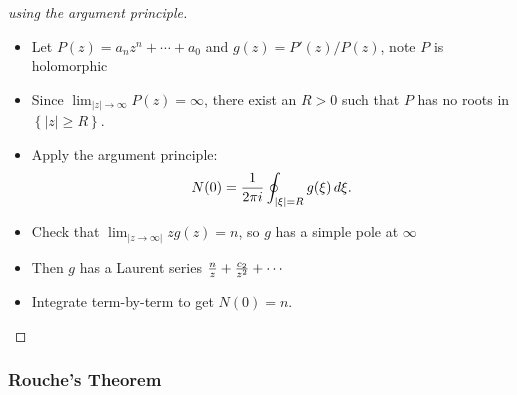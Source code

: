 \begin{proof}[using the argument principle]

\envlist

\begin{itemize}
\tightlist
\item
  Let \(P(z) = a_nz^n + \cdots + a_0\) and \(g(z) = P'(z)/P(z)\), note
  \(P\) is holomorphic
\item
  Since
  \(\lim_{{\left\lvert {z} \right\rvert} \to \infty} P(z) = \infty\),
  there exist an \(R>0\) such that \(P\) has no roots in
  \(\left\{{{\left\lvert {z} \right\rvert} \geq R}\right\}\).
\item
  Apply the argument principle:
  \begin{align*}     N(0) = {1\over 2\pi i} \oint_{{\left\lvert {\xi} \right\rvert} = R} g(\xi) \,d\xi     .\end{align*}
\item
  Check that
  \(\lim_{{\left\lvert {z\to \infty} \right\rvert}}zg(z) = n\), so \(g\)
  has a simple pole at \(\infty\)
\item
  Then \(g\) has a Laurent series
  \({n\over z} + {c_2 \over z^2} + \cdots\)
\item
  Integrate term-by-term to get \(N(0) = n\).
\end{itemize}

\end{proof}

\hypertarget{rouches-theorem}{%
\subsubsection{Rouche's Theorem}\label{rouches-theorem}}

